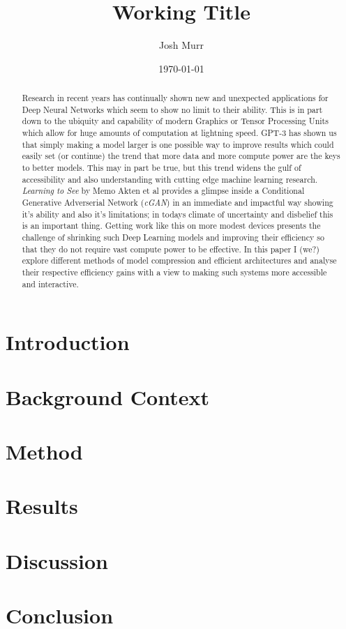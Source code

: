 \documentclass[a4paper]{article}
\title{ Working Title }
\date{\today}
\author{Josh Murr}
\begin{document}
\maketitle

\begin{abstract}
  Research in recent years has continually shown new and unexpected applications for Deep Neural Networks which seem to show no limit to their ability. This is in part down to the ubiquity and capability of modern Graphics or Tensor Processing Units which allow for huge amounts of computation at lightning speed. GPT-3 has shown us that simply making a model larger is one possible way to improve results\cite{2005.14165} which could easily set (or continue) the trend that more data and more compute power are the keys to better models. This may in part be true, but this trend widens the gulf of accessibility and also understanding with cutting edge machine learning research. \textit{Learning to See} by Memo Akten et al\cite{2003.00902} provides a glimpse inside a Conditional Generative Adverserial Network (\textit{cGAN}) in an immediate and impactful way showing it's ability and also it's limitations; in todays climate of uncertainty and disbelief this is an important thing. Getting work like this on more modest devices presents the challenge of shrinking such Deep Learning models and improving their efficiency so that they do not require vast compute power to be effective. In this paper I (we?) explore different methods of model compression and efficient architectures and analyse their respective efficiency gains with a view to making such systems more accessible and interactive.
\end{abstract}

\section{Introduction}

\section{Background Context}

\section{Method}

\section{Results}

\section{Discussion}

\section{Conclusion}


\medskip
\printbibliography
\end{document}
